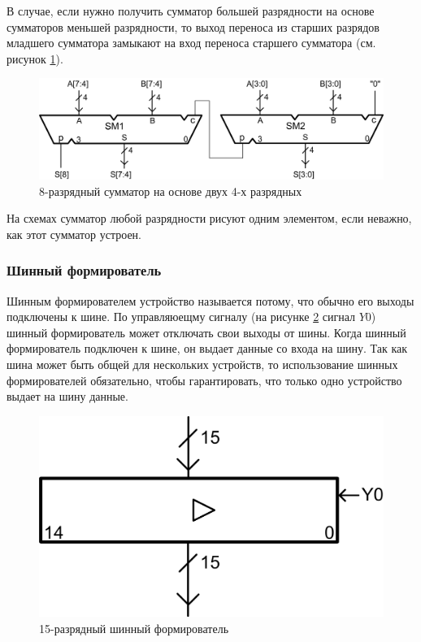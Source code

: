 В случае, если нужно получить сумматор большей разрядности на основе сумматоров меньшей разрядности, то выход переноса из старших разрядов младшего сумматора замыкают на вход переноса старшего сумматора (см. рисунок \ref{fig::ch::practice::summators}).
\begin{figure}[!ht]
    \centering
    \includegraphics[width=.85\textwidth]{fig/summators}
    \caption{8-разрядный сумматор на основе двух 4-х разрядных}
    \label{fig::ch::practice::summators}
\end{figure}

На схемах сумматор любой разрядности рисуют одним элементом, если неважно, как этот сумматор устроен.


\subsubsection{Шинный формирователь}

Шинным формирователем устройство называется потому, что обычно его выходы подключены к шине. По управляюещму сигналу (на рисунке \ref{fig::ch::practice::zbuffer} сигнал $Y0$) шинный формирователь может отключать свои выходы от шины. Когда шинный формирователь подключен к шине, он выдает данные со входа на шину. Так как шина может быть общей для нескольких устройств, то использование шинных формирователей обязательно, чтобы гарантировать, что только одно устройство выдает на шину данные.

\begin{figure}[!ht]
    \centering
    \includegraphics{fig/zbuffer}
    \caption{15-разрядный шинный формирователь}
    \label{fig::ch::practice::zbuffer}
\end{figure}


